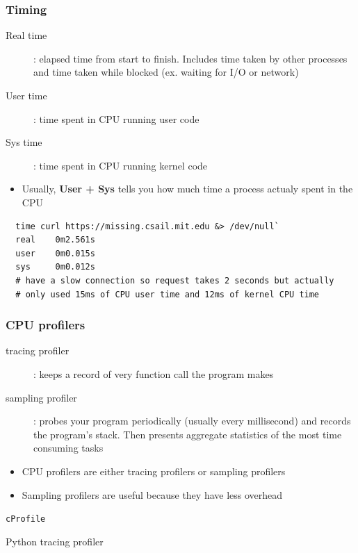 \documentclass[letterpaper,12pt]{article}
\newcommand*{\lstitem}[1]{
  \setbox0\hbox{\lstinline{#1}}
  \item[\usebox0]
}
\begin{document}
\subsubsection{Timing}
\begin{description}
 \item[Real time]: elapsed time from start to finish. Includes time taken by other processes and time taken while blocked (ex. waiting for I/O or network)
 \item[User time]: time spent in CPU running user code
 \item[Sys time]: time spent in CPU running kernel code
\end{description}

\begin{itemize}
 \item Usually, \textbf{User + Sys} tells you how much time a process actualy spent in the CPU
\end{itemize}

\begin{lstlisting}
  time curl https://missing.csail.mit.edu &> /dev/null`
  real    0m2.561s
  user    0m0.015s
  sys     0m0.012s
  # have a slow connection so request takes 2 seconds but actually
  # only used 15ms of CPU user time and 12ms of kernel CPU time
\end{lstlisting}

\subsubsection{CPU profilers}
\begin{description}
 \item[tracing profiler]: keeps a record of very function call the program makes
 \item[sampling profiler]: probes your program periodically (usually every millisecond) and records the program's stack. Then presents aggregate statistics of the most time consuming tasks
\end{description}
\begin{itemize}
 \item CPU profilers are either tracing profilers or sampling profilers
 \item Sampling profilers are useful because they have less overhead
\end{itemize}

\begin{description}
 \lstitem{cProfile} Python tracing profiler
\end{description}
\end{document}
